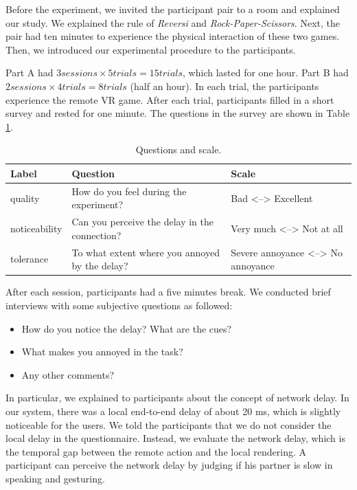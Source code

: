 Before the experiment, we invited the participant pair to a room and explained our study. We explained the rule of \emph{Reversi} and \emph{Rock-Paper-Scissors}. Next, the pair had ten minutes to experience the physical interaction of these two games. Then, we introduced our experimental procedure to the participants.

Part A had $3 sessions \times 5 trials = 15 trials$, which lasted for one hour. Part B had $2 sessions \times 4 trials = 8 trials$ (half an hour). In each trial, the participants experience the remote VR game. After each trial, participants filled in a short survey and rested for one minute. The questions in the survey are shown in Table \ref{tab:table_experiment}.

\begin{table} [!htbp]
\begin{tabular}{|p{}|p{}|p{}|}
\hline 
Label & Question & Scale \\
\hline
quality & How do you feel during the experiment? & Bad <--> Excellent \\
\hline
noticeability & Can you perceive the delay in the connection? & Very much <--> Not at all \\
\hline
tolerance & To what extent where you annoyed by the delay? & Severe annoyance <--> No annoyance \\
\hline
\end{tabular}
\caption{Questions and scale.}
\label{tab:table_experiment}
\end{table}

After each session, participants had a five minutes break. We conducted brief interviews with some subjective questions as followed:

\begin{itemize}
    \item How do you notice the delay? What are the cues?
    
    \item What makes you annoyed in the task?
    
    \item Any other comments?
\end{itemize}

In particular, we explained to participants about the concept of network delay. In our system, there was a local end-to-end delay of about 20 ms, which is slightly noticeable for the users. We told the participants that we do not consider the local delay in the questionnaire. Instead, we evaluate the network delay, which is the temporal gap between the remote action and the local rendering. A participant can perceive the network delay by judging if his partner is slow in speaking and gesturing.

